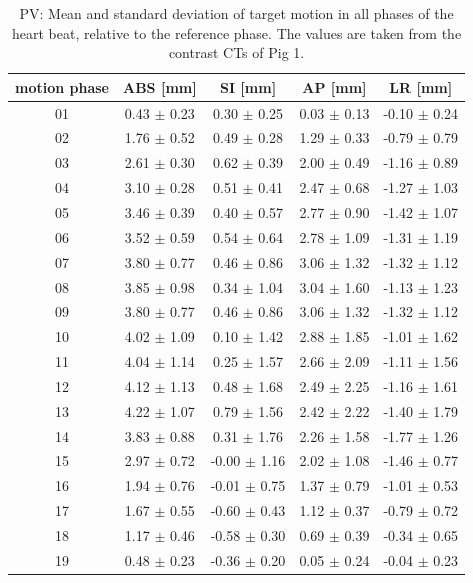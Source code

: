 \documentclass[type=dr, dr=rernat, accentcolor=tud7b,colorbacktitle, bigchapter, openright, twoside, 12pt ]{tudthesis}
\begin{document}
\begin{table}[htbp]
  \centering
  \caption{PV: Mean and standard deviation of target motion in all phases of the heart beat, relative to the reference phase. The values are 
  taken from the contrast CTs of Pig 1.}
  \begin{tabular}{|c|c|c|c|c|}
    \hline\hline
    motion phase\rule{0pt}{2.6ex}\rule[-1.2ex]{0pt}{0pt} & ABS [mm] & SI [mm] & AP [mm] & LR [mm]\\
    \hline
01 &0.43 $\pm$ 0.23 &0.30 $\pm$ 0.25 &0.03 $\pm$ 0.13 &-0.10 $\pm$ 0.24 \\
02 &1.76 $\pm$ 0.52 &0.49 $\pm$ 0.28 &1.29 $\pm$ 0.33 &-0.79 $\pm$ 0.79 \\
03 &2.61 $\pm$ 0.30 &0.62 $\pm$ 0.39 &2.00 $\pm$ 0.49 &-1.16 $\pm$ 0.89 \\
04 &3.10 $\pm$ 0.28 &0.51 $\pm$ 0.41 &2.47 $\pm$ 0.68 &-1.27 $\pm$ 1.03 \\
05 &3.46 $\pm$ 0.39 &0.40 $\pm$ 0.57 &2.77 $\pm$ 0.90 &-1.42 $\pm$ 1.07 \\
06 &3.52 $\pm$ 0.59 &0.54 $\pm$ 0.64 &2.78 $\pm$ 1.09 &-1.31 $\pm$ 1.19 \\
07 &3.80 $\pm$ 0.77 &0.46 $\pm$ 0.86 &3.06 $\pm$ 1.32 &-1.32 $\pm$ 1.12 \\
08 &3.85 $\pm$ 0.98 &0.34 $\pm$ 1.04 &3.04 $\pm$ 1.60 &-1.13 $\pm$ 1.23 \\
09 &3.80 $\pm$ 0.77 &0.46 $\pm$ 0.86 &3.06 $\pm$ 1.32 &-1.32 $\pm$ 1.12 \\
10 &4.02 $\pm$ 1.09 &0.10 $\pm$ 1.42 &2.88 $\pm$ 1.85 &-1.01 $\pm$ 1.62 \\
11 &4.04 $\pm$ 1.14 &0.25 $\pm$ 1.57 &2.66 $\pm$ 2.09 &-1.11 $\pm$ 1.56 \\
12 &4.12 $\pm$ 1.13 &0.48 $\pm$ 1.68 &2.49 $\pm$ 2.25 &-1.16 $\pm$ 1.61 \\
13 &4.22 $\pm$ 1.07 &0.79 $\pm$ 1.56 &2.42 $\pm$ 2.22 &-1.40 $\pm$ 1.79 \\
14 &3.83 $\pm$ 0.88 &0.31 $\pm$ 1.76 &2.26 $\pm$ 1.58 &-1.77 $\pm$ 1.26 \\
15 &2.97 $\pm$ 0.72 &-0.00 $\pm$ 1.16 &2.02 $\pm$ 1.08 &-1.46 $\pm$ 0.77 \\
16 &1.94 $\pm$ 0.76 &-0.01 $\pm$ 0.75 &1.37 $\pm$ 0.79 &-1.01 $\pm$ 0.53 \\
17 &1.67 $\pm$ 0.55 &-0.60 $\pm$ 0.43 &1.12 $\pm$ 0.37 &-0.79 $\pm$ 0.72 \\
18 &1.17 $\pm$ 0.46 &-0.58 $\pm$ 0.30 &0.69 $\pm$ 0.39 &-0.34 $\pm$ 0.65 \\
19 &0.48 $\pm$ 0.23 &-0.36 $\pm$ 0.20 &0.05 $\pm$ 0.24 &-0.04 $\pm$ 0.23 \\
    \hline\hline
  \end{tabular}
  \label{tab:motion:PV:Pig1}
\end{table}
\end{document}
